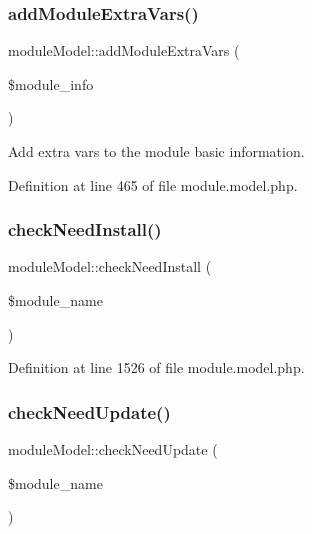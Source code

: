 \subsubsection{\texorpdfstring{add\+Module\+Extra\+Vars()}{addModuleExtraVars()}}
{\footnotesize\ttfamily module\+Model\+::add\+Module\+Extra\+Vars (\begin{DoxyParamCaption}\item[{}]{\$module\+\_\+info }\end{DoxyParamCaption})}



Add extra vars to the module basic information. 



Definition at line 465 of file module.\+model.\+php.

\mbox{\label{classmoduleModel_a0a2303f1634b4937509e9b21e811d1ad}} 
\subsubsection{\texorpdfstring{check\+Need\+Install()}{checkNeedInstall()}}
{\footnotesize\ttfamily module\+Model\+::check\+Need\+Install (\begin{DoxyParamCaption}\item[{}]{\$module\+\_\+name }\end{DoxyParamCaption})}



Definition at line 1526 of file module.\+model.\+php.

\mbox{\label{classmoduleModel_adb7f7c6facce819f69ae5e29db2018cc}} 
\subsubsection{\texorpdfstring{check\+Need\+Update()}{checkNeedUpdate()}}
{\footnotesize\ttfamily module\+Model\+::check\+Need\+Update (\begin{DoxyParamCaption}\item[{}]{\$module\+\_\+name }\end{DoxyParamCaption})}



